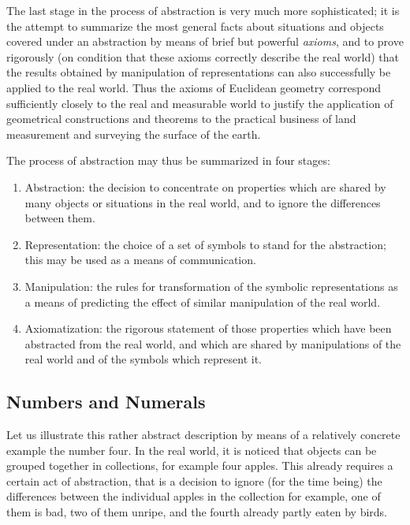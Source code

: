 The last stage in the process of abstraction is very much more sophisticated; it is the attempt to summarize the most general facts about situations and objects covered under an abstraction by means of brief but powerful \textit{axioms}, and to prove rigorously (on condition that these axioms correctly describe the real world) that the results obtained by manipulation of representations can also successfully be applied to the real world. Thus the axioms of Euclidean geometry correspond sufficiently closely to the real and measurable world to justify the application of geometrical constructions and theorems to the practical business of land measurement and surveying the surface of the earth.

The process of abstraction may thus be summarized in four stages:

\begin{enumerate}[wide, nosep, label=(\arabic*)]
	\item Abstraction: the decision to concentrate on properties which are shared  by many objects or situations in the real world, and to ignore the differences between them.
	\item Representation: the choice of a set of symbols to stand for the abstraction; this may be used as a means of communication.
	\item Manipulation: the rules for transformation of the symbolic representations as a means of predicting the effect of similar manipulation of the real world.
	\item Axiomatization: the rigorous statement of those properties which have been abstracted from the real world, and which are shared by manipulations of the real world and of the symbols which represent it.
\end{enumerate}

\subsection{Numbers and Numerals}
Let us illustrate this rather abstract description by means of a relatively concrete example \textemdash{} the number four. In the real world, it is noticed that objects can be grouped together in collections, for example four apples. This already requires a certain act of abstraction, that is a decision to ignore (for the time being) the differences between the individual apples in the collection \textemdash{} for example, one of them is bad, two of them unripe, and the fourth already partly eaten by birds.

